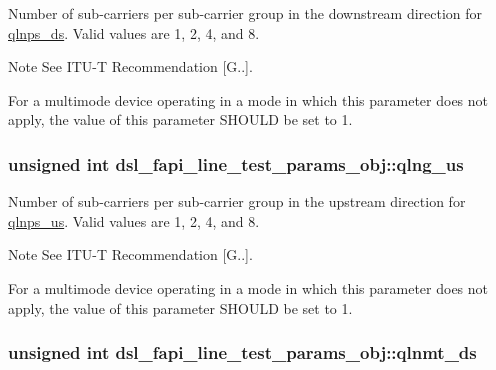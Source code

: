 Number of sub-\/carriers per sub-\/carrier group in the downstream direction for \hyperlink{structdsl__fapi__line__test__params__obj_ae4b24cb005ff35e5a582b46249891085}{qlnps\-\_\-ds}. Valid values are 1, 2, 4, and 8. \begin{DoxyNote}{Note}
See I\-T\-U-\/\-T Recommendation \mbox{[}G..\mbox{]}. 

For a multimode device operating in a mode in which this parameter does not apply, the value of this parameter S\-H\-O\-U\-L\-D be set to 1. 
\end{DoxyNote}
\hypertarget{structdsl__fapi__line__test__params__obj_a308e439c5c561eda195fa95aee84505f}{
\subsubsection[{qlng\-\_\-us}]{\setlength{\rightskip}{0pt plus 5cm}unsigned int dsl\-\_\-fapi\-\_\-line\-\_\-test\-\_\-params\-\_\-obj\-::qlng\-\_\-us}}\label{structdsl__fapi__line__test__params__obj_a308e439c5c561eda195fa95aee84505f}
Number of sub-\/carriers per sub-\/carrier group in the upstream direction for \hyperlink{structdsl__fapi__line__test__params__obj_a07497d9f33930bf1ab615c4ee4b5ed59}{qlnps\-\_\-us}. Valid values are 1, 2, 4, and 8. \begin{DoxyNote}{Note}
See I\-T\-U-\/\-T Recommendation \mbox{[}G..\mbox{]}. 

For a multimode device operating in a mode in which this parameter does not apply, the value of this parameter S\-H\-O\-U\-L\-D be set to 1. 
\end{DoxyNote}
\hypertarget{structdsl__fapi__line__test__params__obj_a8c4cb97cde0a44a01190da61bb2191d2}{
\subsubsection[{qlnmt\-\_\-ds}]{\setlength{\rightskip}{0pt plus 5cm}unsigned int dsl\-\_\-fapi\-\_\-line\-\_\-test\-\_\-params\-\_\-obj\-::qlnmt\-\_\-ds}}\label{structdsl__fapi__line__test__params__obj_a8c4cb97cde0a44a01190da61bb2191d2}
